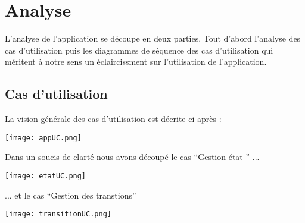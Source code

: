\section{Analyse}
L'analyse de l'application se découpe en deux parties. Tout d'abord l'analyse des cas d'utilisation puis les diagrammes de séquence des cas d'utilisation qui méritent à notre sens un éclaircissment sur l'utilisation de l'application.
\subsection{Cas d'utilisation} %
\label{sub:cas_d_utilisation}
La vision générale des cas d'utilisation est décrite ci-après :
\begin{center}
	\texttt{[image: appUC.png]}
\end{center}
\newpage
Dans un soucis de clarté nous avons découpé le cas ``Gestion état '' ...
\begin{center}
	\texttt{[image: etatUC.png]}
\end{center}
\newpage
... et le cas ``Gestion des transtions''
\begin{center}
	\texttt{[image: transitionUC.png]}
\end{center}
\newpage